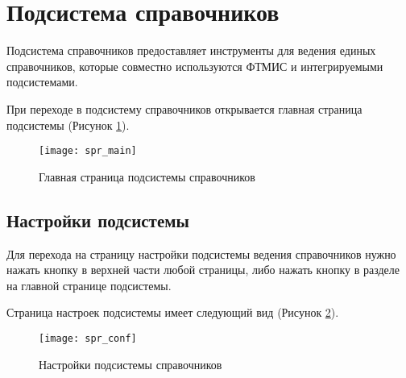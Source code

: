 \newpage
\section{Подсистема справочников}

Подсистема справочников предоставляет инструменты для ведения единых справочников, которые совместно используются  ФТМИС и интегрируемыми подсистемами.

При переходе в подсистему справочников открывается главная страница подсистемы (Рисунок \ref{img_spr_main}).

\begin{figure}[ht]\centering
 \texttt{[image: spr\_main]}
 \caption{Главная страница подсистемы справочников}
 \label{img_spr_main}
\end{figure}

\subsection{Настройки подсистемы}

Для перехода на страницу настройки подсистемы ведения справочников нужно нажать кнопку   в верхней части любой страницы, либо нажать кнопку   в разделе  на главной странице подсистемы.

Страница настроек подсистемы имеет следующий вид (Рисунок \ref{img_spr_conf}).

\begin{figure}[ht]\centering
 \texttt{[image: spr\_conf]}
 \caption{Настройки подсистемы справочников}
 \label{img_spr_conf}
\end{figure}
 
